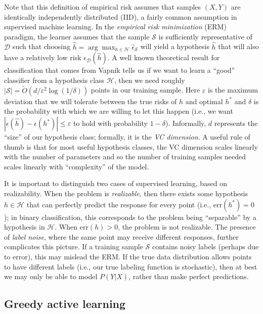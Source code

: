 \noindent Note that this definition of empirical risk assumes that samples $(X, Y)$ are identically independently distributed (IID), a fairly common assumption in supervised machine learning. In the \textit{empirical risk minimization} (ERM) paradigm, the learner assumes that the sample $\mathcal{S}$ is sufficiently representative of $\mathcal{D}$ such that choosing $\hat{h} = \arg\max_{h \in \mathcal{H}} \hat{\epsilon}_{\mathcal{S}}$ will yield a hypothesis $\hat{h}$ that will also have a relatively low risk $\epsilon_{\mathcal{D}}(\hat{h})$. A well known theoretical result for classification that comes from Vapnik tells us if we want to learn a ``good'' classifier from a hypothesis class $\mathcal{H}$, then we need roughly $|\mathcal{S}| = \widetilde{O}\left(d/\varepsilon^2 \log (1/\delta)\right)$ points in our training sample. Here $\varepsilon$ is the maximum deviation that we will tolerate between the true risks of $\hat{h}$ and optimal $h^\ast$ and $\delta$ is the probability with which we are willing to let this happen (i.e., we want $|\epsilon(\hat{h}) - \epsilon(h^\ast)| \leq \varepsilon$ to hold with probability $1-\delta$). Informally, $d$ represents the ``size'' of our hypothesis class; formally, it is the \textit{VC dimension}. A useful rule of thumb is that for most useful hypothesis classes, the VC dimension scales linearly with the number of parameters and so the number of training samples needed scales linearly with ``complexity'' of the model.

It is important to distinguish two cases of supervised learning, based on realizability. When the problem is \textit{realizable}, then there exists some hypothesis $h \in \mathcal{H}$ that can perfectly predict the response for every point (i.e., $\mathrm{err}(h^\ast) = 0$); in binary classification, this corresponds to the problem being ``separable'' by a hypothesis in $\mathcal{H}$. When $\mathrm{err}(h) > 0$, the problem is not realizable. The presence of \textit{label noise}, where the same point may receive different responses, further complicates this picture. If a training sample $\mathcal{S}$ contains noisy labels (perhaps due to error), this may mislead the ERM. If the true data distribution allows points to have different labels (i.e., our true labeling function is stochastic), then at best we may only be able to model $P(Y|X)$, rather than make perfect predictions.

\subsection{Greedy active learning}

